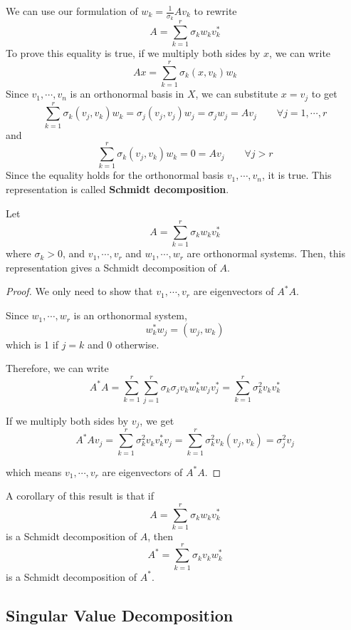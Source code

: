 \begin{definition}
We can use our formulation of $w_{k} = \frac{1}{\sigma_{k}} Av_{k}$ to rewrite 
$$A = \sum_{k = 1}^{r} \sigma_{k} w_{k} v_{k}^{*}$$
To prove this equality is true, if we multiply both sides by $x$, we can write 
$$Ax = \sum_{k = 1}^{r} \sigma_{k} (x, v_{k}) w_{k}$$
Since $v_{1}, \cdots, v_{n}$ is an orthonormal basis in $X$, we can substitute $x = v_{j}$ to get 
$$\sum_{k = 1}^{r} \sigma_{k} (v_{j}, v_{k}) w_{k} = \sigma_{j} (v_{j}, v_{j}) w_{j} = \sigma_{j} w_{j} = Av_{j} \qquad \forall j = 1, \cdots, r$$
and 
$$\sum_{k = 1}^{r} \sigma_{k} (v_{j}, v_{k}) w_{k} = 0 = Av_{j} \qquad \forall j > r$$
Since the equality holds for the orthonormal basis $v_{1}, \cdots, v_{n}$, it is true. This representation is called \textbf{Schmidt decomposition}.
\end{definition}

\begin{theorem}
Let
$$A = \sum_{k=1}^{r} \sigma_{k} w_{k} v_{k}^{*}$$
where $\sigma_{k} > 0$, and $v_{1}, \cdots, v_{r}$ and $w_{1}, \cdots, w_{r}$ are orthonormal systems. Then, this representation gives a Schmidt decomposition of $A$. 
\end{theorem}

\begin{proof}
We only need to show that $v_{1}, \cdots, v_{r}$ are eigenvectors of $A^{*}A$. 

Since $w_{1}, \cdots, w_{r}$ is an orthonormal system, 
$$w_{k}^{*} w_{j} = (w_{j}, w_{k})$$ 
which is 1 if $j = k$ and 0 otherwise. 

Therefore, we can write 
$$A^{*} A = \sum_{k=1}^{r} \sum_{j=1}^{r} \sigma_{k} \sigma_{j}    v_{k} w_{k}^{*} w_{j} v_{j}^{*} = \sum_{k=1}^{r} \sigma_{k}^{2} v_{k} v_{k}^{*}$$

If we multiply both sides by $v_{j}$, we get 
$$A^{*} A v_{j} = \sum_{k=1}^{r} \sigma_{k}^{2} v_{k} v_{k}^{*}v_{j} = \sum_{k=1}^{r} \sigma_{k}^{2} v_{k} (v_{j}, v_{k}) = \sigma_{j}^{2} v_{j}$$

which means $v_{1}, \cdots, v_{r}$ are eigenvectors of $A^{*} A$. 
\end{proof}

A corollary of this result is that if 
$$A = \sum_{k=1}^{r} \sigma_{k} w_{k} v_{k}^{*}$$
is a Schmidt decomposition of $A$, then 
$$A^{*} = \sum_{k=1}^{r} \sigma_{k} v_{k} w_{k}^{*}$$
is a Schmidt decomposition of $A^{*}$. 

\subsection{Singular Value Decomposition}

